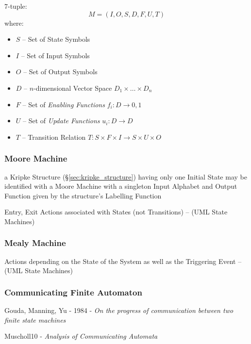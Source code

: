 $7$-tuple:
\[
  M = (I,O,S,D,F,U,T)
\]
where:
\begin{itemize}
  \item $S$ -- Set of State Symbols
  \item $I$ -- Set of Input Symbols
  \item $O$ -- Set of Output Symbols
  \item $D$ -- $n$-dimensional Vector Space $D_1 \times \ldots \times
    D_n$
  \item $F$ -- Set of \emph{Enabling Functions} $f_i : D \rightarrow
    {0,1}$
  \item $U$ -- Set of \emph{Update Functions} $u_i : D \rightarrow D$
  \item $T$ -- Transition Relation $T : S \times F \times I
    \rightarrow S \times U \times O$
\end{itemize}



\subsubsection{Moore Machine}\label{sec:moore_machine}


a Kripke Structure (\S\ref{sec:kripke_structure}) having only one
Initial State may be identified with a Moore Machine with a singleton
Input Alphabet and Output Function given by the structure's Labelling
Function

Entry, Exit Actions associated with States (not Transitions) -- (UML
State Machines)



\subsubsection{Mealy Machine}\label{sec:mealy_machine}


Actions depending on the State of the System as well as the Triggering
Event -- (UML State Machines)



\subsubsection{Communicating Finite Automaton}
\label{sec:communicating_fsm}

Gouda, Manning, Yu - 1984 -
\emph{On the progress of communication between two finite state machines}

Muscholl10 - \emph{Analysis of Communicating Automata}

